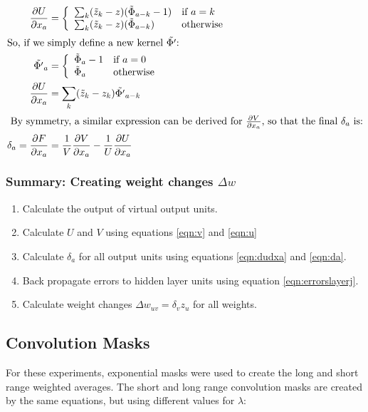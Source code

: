 \documentclass[a4paper]{article}
\newcommand{\ztilde}{\tilde{z}}
\newcommand{\skernel}{\tilde{\Phi}}
\newcommand{\dskernel}{\tilde{\Phi'}}
\newcommand{\pdiff}[2]{ \frac{\partial #1}{\partial #2}}
\begin{document}
\begin{align}
  \pdiff{U}{x_a} &= \left\{
    \begin{array}{ll}
      \sum_k (\ztilde_k - z) ( \skernel_{a-k} - 1) & \text{if $a=k$}
      \\
      \sum_k (\ztilde_k - z) ( \skernel_{a-k}) & \text{otherwise}\\
    \end{array}
    \right.\\
\intertext{So, if we simply define a new kernel $\dskernel$:}
\dskernel_a &= \left \{
  \begin{array}{ll}
    \skernel_a -1 & \text{if $a=0$} \\
    \skernel_a & \text{otherwise} \\
  \end{array}
  \right. \\
\pdiff{U}{x_a} &= \sum_k (\ztilde_k - z_k) \dskernel_{a-k}
\label{eqn:dudxa} \\
\intertext{ By symmetry, a similar expression can be derived
for $\pdiff{V}{x_a}$, so that the final $\delta_a$ is:}
\delta_a = \pdiff{F}{x_a} &= \frac{1}{V} \pdiff{V}{x_a} - 
\frac{1}{U} \pdiff{U}{x_a} \label{eqn:da}
\end{align}


\subsubsection{Summary: Creating weight changes $\Delta w$}

\begin{enumerate}
\item Calculate the output of virtual output units.
\item Calculate $U$ and $V$ using equations \ref{eqn:v} and \ref{eqn:u}
\item Calculate $\delta_a$ for all output units using equations
  \ref{eqn:dudxa} and \ref{eqn:da}.
\item Back propagate errors to hidden layer units using equation
  \ref{eqn:errorslayerj}.

\item Calculate weight changes $\Delta w_{uv} = \delta_v z_u$ for all weights.

\end{enumerate}


\subsection{Convolution Masks}
\label{sec:masks}
For these experiments, exponential masks were used to create the long
and short range weighted averages.  The short and long range
convolution masks are created by the same equations, but using
different values for $\lambda$:
\end{document}
